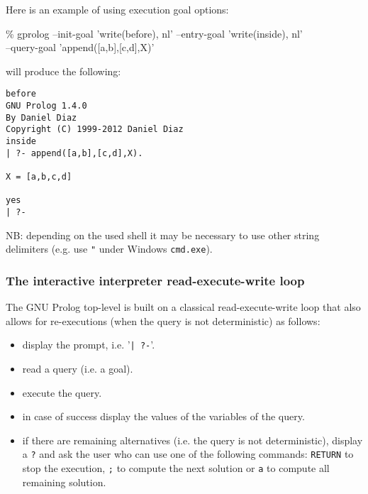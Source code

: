 Here is an example of using execution goal options:

\begin{Code}
\% gprolog --init-goal 'write(before), nl' --entry-goal 'write(inside), nl'\\
--query-goal 'append([a,b],[c,d],X)'
\end{Code}

will produce the following:

\begin{Code}
\begin{verbatim}
before
GNU Prolog 1.4.0
By Daniel Diaz
Copyright (C) 1999-2012 Daniel Diaz
inside
| ?- append([a,b],[c,d],X).

X = [a,b,c,d]

yes
| ?-
\end{verbatim}
\end{Code}

NB: depending on the used shell it may be necessary to use other string
delimiters (e.g. use \texttt{"} under Windows \texttt{cmd.exe}).

\subsubsection{The interactive interpreter read-execute-write loop}
The GNU Prolog top-level is built on a classical read-execute-write loop that
also allows for re-executions (when the query is not deterministic) as
follows:

\begin{itemize}

\item display the prompt, i.e. '\texttt{| ?-}'.

\item read a query (i.e. a goal).

\item execute the query.

\item in case of success display the values of the variables of the query.

\item if there are remaining alternatives (i.e. the query is not
deterministic), display a \texttt{?} and ask the user who can use one of the
following commands: \texttt{RETURN} to stop the execution, \texttt{;} to
compute the next solution or \texttt{a} to compute all remaining solution.

\end{itemize}

